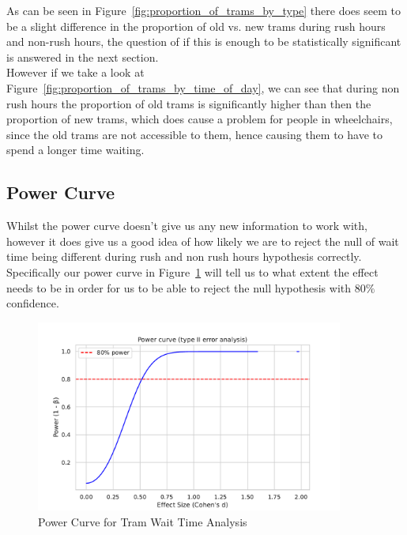 \documentclass[a4paper, 10pt]{article}
\begin{document}
				\noindent As can be seen in Figure~\ref{fig:proportion_of_trams_by_type} there does seem to be a slight difference in 
				the proportion of old vs. new trams during rush hours and non-rush hours, the question of if this is enough 
				to be statistically significant is answered in the next section. \\

				\noindent However if we take a look at Figure~\ref{fig:proportion_of_trams_by_time_of_day}, we can see that during
				non rush hours the proportion of old trams is significantly higher than then the proportion of new trams, which does
				cause a problem for people in wheelchairs, since the old trams are not accessible to them, hence causing them to 
				have to spend a longer time waiting. \\

		\newpage
		\subsection{Power Curve}
				\noindent Whilst the power curve doesn't give us any new information to work with, 
				however it does give us a good idea of how likely we are to reject the null of wait time being different during
				rush and non rush hours hypothesis correctly. \\

				\noindent Specifically our power curve in Figure~\ref{fig:power_curve} 
				will tell us to what extent the effect needs to be in order for us to be able to reject the null hypothesis with
				$80\%$ confidence. \\

				\begin{figure}[h!]
					\centering
					\includegraphics[width=0.9\textwidth]{Plot_PowerCurve.pdf}
					\caption{Power Curve for Tram Wait Time Analysis}
					\label{fig:power_curve}	
				\end{figure}
\end{document}
